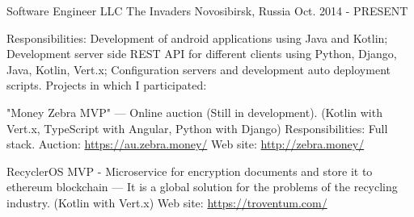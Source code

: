 


\begin{cventries}


\cventry
{Software Engineer} %
{LLC The Invaders} %
{Novosibirsk, Russia} %
{Oct. 2014 - PRESENT} %
{
Responsibilities: Development of android applications using Java and Kotlin; Development server side REST API for different clients using Python, Django, Java, Kotlin, Vert.x; Configuration servers and development auto deployment scripts.\linebreak
\linebreak
Projects in which I participated:\linebreak
\linebreak
\begin{cvitems}
    \item {
        \begin{flushleft}
            "Money Zebra MVP" --- Online auction (Still in development). (Kotlin with Vert.x, TypeScript with Angular, Python with Django)\linebreak
            Responsibilities: Full stack.\linebreak
            Auction: \url{https://au.zebra.money/}\linebreak
            Web site: \url{http://zebra.money/}\linebreak
        \end{flushleft}
    }
    \item {
        \begin{flushleft}
            RecyclerOS MVP - Microservice for encryption documents and store it to ethereum blockchain — It is a global solution for the problems of the recycling industry. (Kotlin with Vert.x)\linebreak
            Web site: \url{https://troventum.com/}\linebreak
        \end{flushleft}
    }

\end{cvitems}}
\end{cventries}
